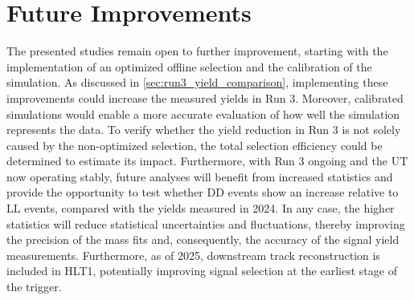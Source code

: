 \section{Future Improvements}
\label{sec:run3_future_improvements}
The presented studies remain open to further improvement, starting with the implementation of an optimized offline selection and the calibration of the simulation. As discussed in \cref{sec:run3_yield_comparison}, implementing these improvements could increase the measured yields in Run 3. Moreover, calibrated simulations would enable a more accurate evaluation of how well the simulation represents the data. To verify whether the yield reduction in Run 3 is not solely caused by the non-optimized selection, the total selection efficiency could be determined to estimate its impact. Furthermore, with Run 3 ongoing and the UT now operating stably, future analyses will benefit from increased statistics and provide the opportunity to test whether DD events show an increase relative to LL events, compared with the yields measured in 2024. In any case, the higher statistics will reduce statistical uncertainties and fluctuations, thereby improving the precision of the mass fits and, consequently, the accuracy of the signal yield measurements. Furthermore, as of 2025, downstream track reconstruction is included in HLT1, potentially improving signal selection at the earliest stage of the trigger.




